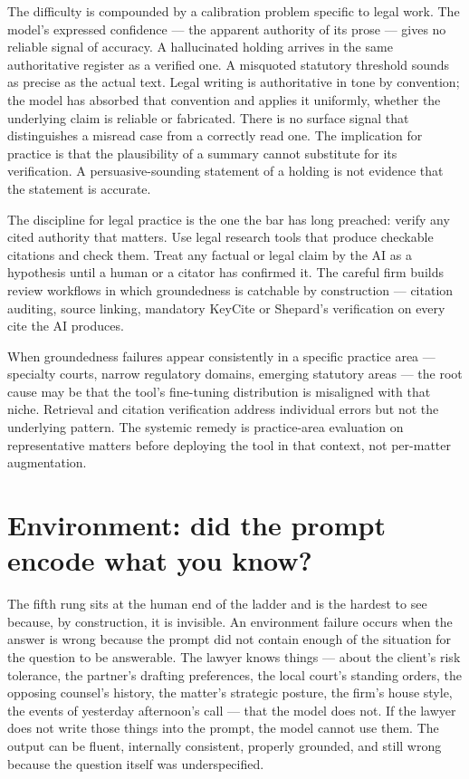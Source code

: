 \documentclass[11pt,a4paper]{article}
\begin{document}
The difficulty is compounded by a calibration problem specific to
legal work. The model's expressed confidence --- the apparent
authority of its prose --- gives no reliable signal of accuracy.
A hallucinated holding arrives in the same authoritative register
as a verified one. A misquoted statutory threshold sounds as
precise as the actual text. Legal writing is authoritative in
tone by convention; the model has absorbed that convention and
applies it uniformly, whether the underlying claim is reliable or
fabricated. There is no surface signal that distinguishes a
misread case from a correctly read one. The implication for
practice is that the plausibility of a summary cannot substitute
for its verification. A persuasive-sounding statement of a
holding is not evidence that the statement is accurate.

The discipline for legal practice is the one the bar has long
preached: verify any cited authority that matters. Use legal
research tools that produce checkable citations and check them.
Treat any factual or legal claim by the AI as a hypothesis until a
human or a citator has confirmed it. The careful firm builds
review workflows in which groundedness is catchable by
construction --- citation auditing, source linking, mandatory
KeyCite or Shepard's verification on every cite the AI produces.

When groundedness failures appear consistently in a specific
practice area --- specialty courts, narrow regulatory domains,
emerging statutory areas --- the root cause may be that the
tool's fine-tuning distribution is misaligned with that niche.
Retrieval and citation verification address individual errors but
not the underlying pattern. The systemic remedy is practice-area
evaluation on representative matters before deploying the tool in
that context, not per-matter augmentation.

\section*{Environment: did the prompt encode what you know?}

The fifth rung sits at the human end of the ladder and is the
hardest to see because, by construction, it is invisible. An
environment failure occurs when the answer is wrong because the
prompt did not contain enough of the situation for the question to
be answerable. The lawyer knows things --- about the client's
risk tolerance, the partner's drafting preferences, the local
court's standing orders, the opposing counsel's history, the
matter's strategic posture, the firm's house style, the events of
yesterday afternoon's call --- that the model does not. If the
lawyer does not write those things into the prompt, the model
cannot use them. The output can be fluent, internally consistent,
properly grounded, and still wrong because the question itself was
underspecified.
\end{document}
